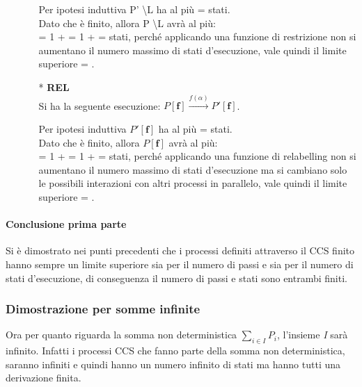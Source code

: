 \begin{itemize}
\begin{itemize}
		Per ipotesi induttiva  P' \textbackslash L ha al più  =  stati. \\
		Dato che  è finito, allora P \textbackslash L avrà al più: \\
		 = 1 +  = 1 +  =  stati, perché applicando una funzione di restrizione non si aumentano il numero massimo di stati d'esecuzione, vale quindi il limite superiore  = .
			\\
		\item[*] \textbf{REL}
		\\
		Si ha la seguente esecuzione: $P \mathbf{[f]} \overset{f(\alpha)}\rightarrow P'\mathbf{[f]}$. 
		
		Per ipotesi induttiva  $P'\mathbf{[f]}$ ha al più  =  stati. \\
		Dato che  è finito, allora $P \mathbf{[f]}$ avrà al più: \\
		 = 1 +  = 1 +  =  stati, perché applicando una funzione di relabelling non si aumentano il numero massimo di stati d'esecuzione ma si cambiano solo le possibili interazioni con altri processi in parallelo, vale quindi il limite superiore  = .
		
	\end{itemize}
\end{itemize}

\paragraph{Conclusione prima parte} \mbox{}

Si è dimostrato nei punti precedenti che i processi definiti attraverso il CCS finito hanno sempre un limite superiore sia per il numero di passi e sia per il numero di stati d'esecuzione, di conseguenza il numero di passi e stati sono entrambi finiti.

\subsubsection{Dimostrazione per somme infinite}
Ora per quanto riguarda la somma non deterministica $\displaystyle\sum_{i\in I}^{}P_{i}$, l'insieme \textit{I} sarà infinito. Infatti i processi CCS che fanno parte della somma non deterministica, saranno infiniti e quindi hanno un numero infinito di stati ma hanno tutti una derivazione finita.

